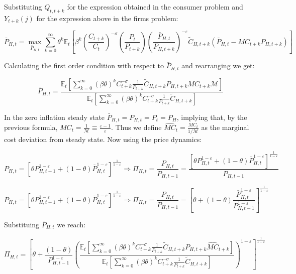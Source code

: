 \documentclass{article}
\newcommand{\Et}{\mathbb{E}_t}
\begin{document}
Substituting $Q_{t, t+k}$ for the expression obtained in the consumer problem and $Y_{t+k}(j)$ for the expression above in the firms problem:

\begin{equation}
    \bar P_{H,t} = \max_{\bar P_{H,t}} \sum^\infty_{k=0} \theta^k \Et \left[ \beta^k \left( \frac{C_{t+k}}{C_t} \right)^{-\sigma} \left( \frac{P_{t}}{P_{t+k}} \right) \left( \frac{\bar P_{H,t}}{P_{H,t+k}} \right)^{-\varepsilon} \tilde C_{H,t+k} (\bar P_{H,t} - MC_{t+k} P_{H,t+k})  \right]
\end{equation}

Calculating the first order condition with respect to $\bar P_{H,t}$ and rearranging we get:

\begin{equation}
    \bar P_{H,t} =  \frac{\Et\left[ \sum^\infty_{k=0} (\beta\theta)^k C_{t+k}^{-\sigma} \frac{1}{P_{t+k}}\tilde C_{H,t+k} P_{H,t+k} MC_{t+k} \mathcal M \right] }{\Et\left[ \sum^\infty_{k=0} (\beta\theta)^k C_{t+k}^{-\sigma} \frac{1}{P_{t+k}} \tilde C_{H,t+k}  \right]}
\end{equation}

In the zero inflation steady state $\bar P_{H,t} = P_{H,t} = P_{t} = P_H$, implying that, by the previous formula, $MC_{t}  = \frac{1}{\mathcal M} \equiv \frac{\varepsilon-1}{\varepsilon}$. Thus we define $\widehat{MC}_t = \frac{MC_t}{1/ \mathcal M}$ as the marginal cost deviation from steady state. Now using the price dynamics:

\begin{equation}
    P_{H,t} = [ \theta P_{H,t-1}^{1-\varepsilon} + (1-\theta) \bar P_{H,t}^{1-\varepsilon}]^\frac{1}{1-\varepsilon} \Rightarrow \Pi_{H,t} = \frac{P_{H,t}}{P_{H,t-1}} =  \frac{\left[ \theta P_{H,t}^{1-\varepsilon} + (1-\theta) \bar P_{H,t}^{1-\varepsilon}\right]^\frac{1}{1-\varepsilon}}{P_{H,t-1}} 
\end{equation}

\begin{equation}
    P_{H,t} = [ \theta P_{H,t-1}^{1-\varepsilon} + (1-\theta) \bar P_{H,t}^{1-\varepsilon}]^\frac{1}{1-\varepsilon} \Rightarrow \Pi_{H,t} = \frac{P_{H,t}}{P_{H,t-1}} =  \left[ \theta + (1-\theta) \frac{\bar P_{H,t}^{1-\varepsilon}}{P_{H,t-1}^{1-\varepsilon}} \right]^\frac{1}{1-\varepsilon} 
\end{equation}

Substituing $\bar P_{H,t}$ we reach:

\begin{equation}
    \Pi_{H,t} = \left[ \theta + \frac{(1-\theta)}{P_{H,t-1}^{1-\varepsilon}} \left(\frac{\Et\left[ \sum^\infty_{k=0} (\beta\theta)^k C_{t+k}^{-\sigma} \frac{1}{P_{t+k}}\tilde C_{H,t+k} P_{H,t+k} \widehat{MC}_{t+k}\right] }{\Et\left[ \sum^\infty_{k=0} (\beta\theta)^k C_{t+k}^{-\sigma} \frac{1}{P_{t+k}} \tilde C_{H,t+k}  \right]} \right)^{1-\varepsilon}\right]^\frac{1}{1-\varepsilon}
\end{equation}
\end{document}
